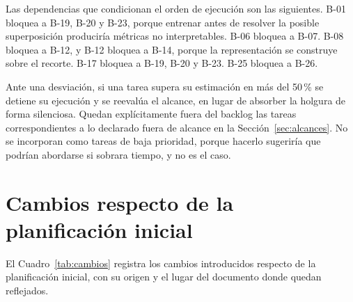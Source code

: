 Las dependencias que condicionan el orden de ejecución son las siguientes. B-01
bloquea a B-19, B-20 y B-23, porque entrenar antes de resolver la posible
superposición produciría métricas no interpretables. B-06 bloquea a B-07. B-08
bloquea a B-12, y B-12 bloquea a B-14, porque la representación se construye
sobre el recorte. B-17 bloquea a B-19, B-20 y B-23. B-25 bloquea a B-26.

Ante una desviación, si una tarea supera su estimación en más del 50\,\% se
detiene su ejecución y se reevalúa el alcance, en lugar de absorber la holgura de
forma silenciosa. Quedan explícitamente fuera del backlog las tareas
correspondientes a lo declarado fuera de alcance en la
Sección~\ref{sec:alcances}. No se incorporan como tareas de baja prioridad,
porque hacerlo sugeriría que podrían abordarse si sobrara tiempo, y no es el caso.

\section{Cambios respecto de la planificación inicial}
\label{sec:anexo-cambios}

El Cuadro~\ref{tab:cambios} registra los cambios introducidos respecto de la
planificación inicial, con su origen y el lugar del documento donde quedan
reflejados.

